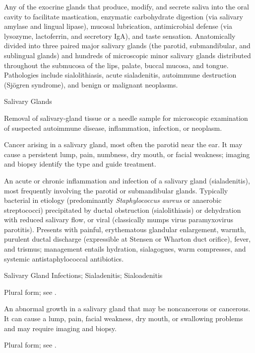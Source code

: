  Any of the exocrine glands that produce, modify, and secrete saliva into the oral cavity to facilitate mastication, enzymatic carbohydrate digestion (via salivary amylase and lingual lipase), mucosal lubrication, antimicrobial defense (via lysozyme, lactoferrin, and secretory IgA), and taste sensation. Anatomically divided into three paired major salivary glands (the parotid, submandibular, and sublingual glands) and hundreds of microscopic minor salivary glands distributed throughout the submucosa of the lips, palate, buccal mucosa, and tongue. Pathologies include sialolithiasis, acute sialadenitis, autoimmune destruction (Sj\"{o}gren syndrome), and benign or malignant neoplasms.

\synonyms
Salivary Glands

 Removal of salivary-gland tissue or a needle sample for microscopic examination of suspected autoimmune disease, inflammation, infection, or neoplasm.

 Cancer arising in a salivary gland, most often the parotid near the ear. It may cause a persistent lump, pain, numbness, dry mouth, or facial weakness; imaging and biopsy identify the type and guide treatment.

 An acute or chronic inflammation and infection of a salivary gland (sialadenitis), most frequently involving the parotid or submandibular glands. Typically bacterial in etiology (predominantly \textit{Staphylococcus aureus} or anaerobic streptococci) precipitated by ductal obstruction (sialolithiasis) or dehydration with reduced salivary flow, or viral (classically mumps virus paramyxovirus parotitis). Presents with painful, erythematous glandular enlargement, warmth, purulent ductal discharge (expressible at Stensen or Wharton duct orifice), fever, and trismus; management entails hydration, sialagogues, warm compresses, and systemic antistaphylococcal antibiotics.

\synonyms
Salivary Gland Infections; Sialadenitis; Sialoadenitis

 Plural form; see .

 An abnormal growth in a salivary gland that may be noncancerous or cancerous. It can cause a lump, pain, facial weakness, dry mouth, or swallowing problems and may require imaging and biopsy.

 Plural form; see .

